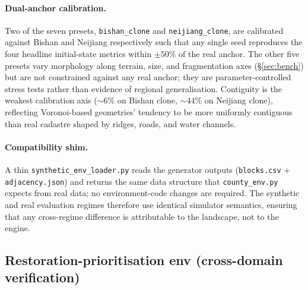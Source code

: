 \documentclass[11pt]{article}
\begin{document}
\paragraph{Dual-anchor calibration.} Two of the seven presets, \texttt{bishan\_clone} and \texttt{neijiang\_clone}, are calibrated against Bishan and Neijiang respectively such that any single seed reproduces the four headline initial-state metrics within $\pm 50\%$ of the real anchor. The other five presets vary morphology along terrain, size, and fragmentation axes (\S\ref{sec:bench}) but are not constrained against any real anchor; they are parameter-controlled stress tests rather than evidence of regional generalisation. Contiguity is the weakest calibration axis ($\sim$$6\%$ on Bishan clone, $\sim$$44\%$ on Neijiang clone), reflecting Voronoi-based geometries' tendency to be more uniformly contiguous than real cadastre shaped by ridges, roads, and water channels.

\paragraph{Compatibility shim.} A thin \texttt{synthetic\_env\_loader.py} reads the generator outputs (\texttt{blocks.csv} + \texttt{adjacency.json}) and returns the same data structure that \texttt{county\_env.py} expects from real data; no environment-code changes are required. The synthetic and real evaluation regimes therefore use identical simulator semantics, ensuring that any cross-regime difference is attributable to the landscape, not to the engine.

\subsection*{Restoration-prioritisation env (cross-domain verification)}\label{sec:methods-restoration}
\end{document}
